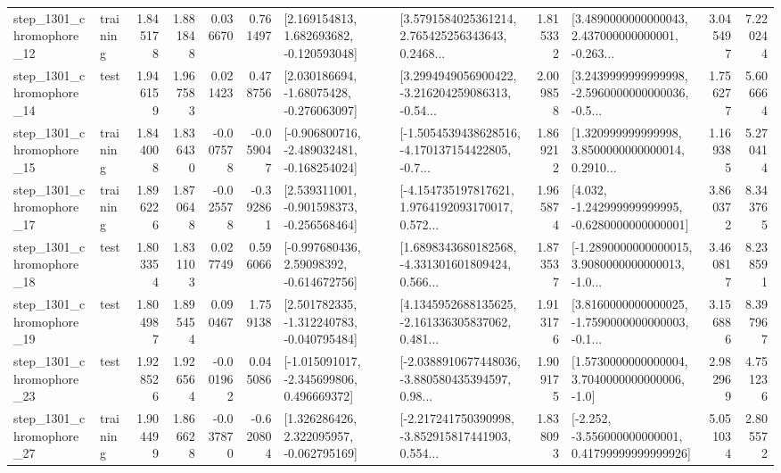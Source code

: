 \begin{tabular}{llrrrrllrlrr}
 step\_1301\_chromophore\_12 &  training &      1.845178 &    1.881848 &      0.036670 &  0.761497 &    [2.169154813, 1.682693682, -0.120593048] &  [3.5791584025361214, 2.765425256343643, 0.2468... &       1.815332 &  [3.4890000000000043, 2.437000000000001, -0.263... &            3.045497 &          7.220244 \\
 step\_1301\_chromophore\_14 &      test &      1.946159 &    1.967583 &      0.021423 &  0.478756 &    [2.030186694, -1.68075428, -0.276063097] &  [3.2994949056900422, -3.216204259086313, -0.54... &       2.009858 &  [3.2439999999999998, -2.5960000000000036, -0.5... &            1.756277 &          5.606664 \\
 step\_1301\_chromophore\_15 &  training &      1.844008 &    1.836430 &     -0.007578 & -0.059047 &  [-0.906800716, -2.489032481, -0.168254024] &  [-1.5054539438628516, -4.170137154422805, -0.7... &       1.869212 &  [1.320999999999998, 3.8500000000000014, 0.2910... &            1.169385 &          5.270414 \\
 step\_1301\_chromophore\_17 &  training &      1.896226 &    1.870648 &     -0.025578 & -0.392861 &   [2.539311001, -0.901598373, -0.256568464] &  [-4.154735197817621, 1.9764192093170017, 0.572... &       1.965874 &   [4.032, -1.242999999999995, -0.6280000000000001] &            3.860372 &          8.343765 \\
 step\_1301\_chromophore\_18 &      test &      1.803354 &    1.831103 &      0.027749 &  0.596066 &    [-0.997680436, 2.59098392, -0.614672756] &  [1.6898343680182568, -4.331301601809424, 0.566... &       1.873537 &  [-1.2890000000000015, 3.9080000000000013, -1.0... &            3.460817 &          8.238591 \\
 step\_1301\_chromophore\_19 &      test &      1.804987 &    1.895454 &      0.090467 &  1.759138 &   [2.501782335, -1.312240783, -0.040795484] &  [4.1345952688135625, -2.161336305837062, 0.481... &       1.913176 &  [3.8160000000000025, -1.7590000000000003, -0.1... &            3.156886 &          8.397967 \\
 step\_1301\_chromophore\_23 &      test &      1.928526 &    1.926564 &     -0.001962 &  0.045086 &   [-1.015091017, -2.345699806, 0.496669372] &  [-2.0388910677448036, -3.880580435394597, 0.98... &       1.909175 &     [1.5730000000000004, 3.7040000000000006, -1.0] &            2.982969 &          4.751236 \\
 step\_1301\_chromophore\_27 &  training &      1.904499 &    1.866628 &     -0.037870 & -0.620804 &    [1.326286426, 2.322095957, -0.062795169] &  [-2.217241750390998, -3.852915817441903, 0.554... &       1.838093 &  [-2.252, -3.556000000000001, 0.41799999999999926] &            5.051034 &          2.805572 \\

\end{tabular}
